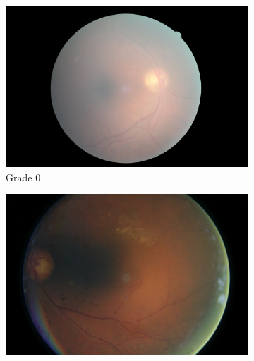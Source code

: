 \begin{figure}[tb]
     \begin{subfigure}[b]{0.3\textwidth}
         \centering
         \includegraphics[width=\textwidth, height=\textwidth]{figures/chapter4/Dataset/noDR/75_right.jpeg}
         \caption{Grade 0}
    \end{subfigure}
     \hfill
         \begin{subfigure}[b]{0.3\textwidth}
        \centering
        \includegraphics[width=\textwidth, height=\textwidth]{figures/chapter4/Dataset/moderate/54_right.jpeg}

\end{subfigure}
\end{figure}
